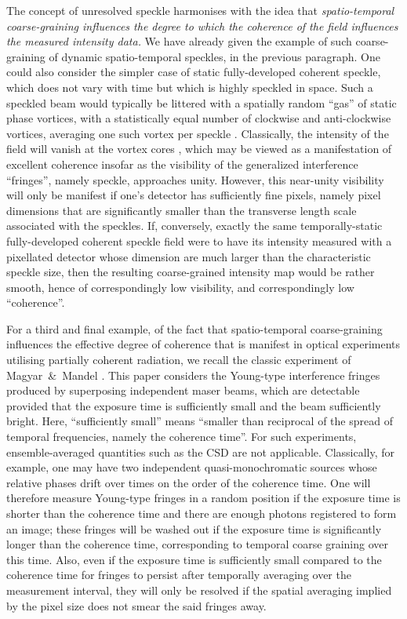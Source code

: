 \documentclass{iucr}              %
\begin{document}
The concept of unresolved speckle harmonises with the idea that {\em spatio-temporal coarse-graining influences the degree to which the coherence of the field influences the measured intensity data.}  We have already given the example of such coarse-graining of dynamic spatio-temporal speckles, in the previous paragraph.  One could also consider the simpler case of static fully-developed coherent speckle, which does not vary with time but which is highly speckled in space.  Such a speckled beam would typically be littered with a spatially random ``gas'' of static phase vortices, with a statistically equal number of clockwise and anti-clockwise vortices, averaging one such vortex per speckle \cite{Goodman2007,paganin_book}.  Classically, the intensity of the field will vanish at the vortex cores \cite{Dirac1931}, which may be viewed as a manifestation of excellent coherence insofar as the visibility of the generalized interference ``fringes'', namely speckle, approaches unity.  However, this near-unity visibility will only be manifest if one's detector has sufficiently fine pixels, namely pixel dimensions that are significantly smaller than the transverse length scale associated with the speckles.  If, conversely, exactly the same temporally-static fully-developed coherent speckle field were to have its intensity measured with a pixellated detector whose dimension are much larger than the characteristic speckle size, then the resulting coarse-grained intensity map would be rather smooth, hence of correspondingly low visibility, and correspondingly low ``coherence''.    

For a third and final example, of the fact that spatio-temporal coarse-graining influences the effective degree of coherence that is manifest in optical experiments utilising partially coherent radiation, we recall the classic experiment of Magyar~\&~Mandel \citeyear{MagyarMandel1963}.  This paper considers the Young-type interference fringes produced by superposing independent maser beams, which are detectable provided that the exposure time is sufficiently small and the beam sufficiently bright.  Here, ``sufficiently small'' means ``smaller than reciprocal of the spread of temporal frequencies, namely the coherence time''.  For such experiments, ensemble-averaged quantities such as the CSD are not applicable.  Classically, for example, one may have two independent quasi-monochromatic sources whose relative phases drift over times on the order of the coherence time.  One will therefore measure Young-type fringes in a random position if the exposure time is shorter than the coherence time and there are enough photons registered to form an image; these fringes will be washed out if the exposure time is significantly longer than the coherence time, corresponding to temporal coarse graining over this time.  Also, even if the exposure time is sufficiently small compared to the coherence time for fringes to persist after temporally averaging over the measurement interval, they will only be resolved if the spatial averaging implied by the pixel size does not smear the said fringes away. 
\end{document}
